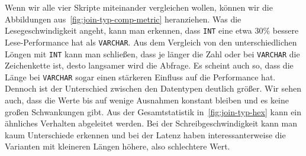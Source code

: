 Wenn wir alle vier Skripte miteinander vergleichen wollen, können wir die Abbildungen aus~\ref{fig:join-typ-comp-metric} heranziehen.
Was die Lesegeschwindigkeit angeht, kann man erkennen, dass \texttt{INT} eine etwa 30\% bessere Lese-Performance hat als \texttt{VARCHAR}.
Aus dem Vergleich von den unterschiedlichen Löngen mit \texttt{INT} kann man schließen, dass je länger die Zahl oder bei \texttt{VARCHAR} die Zeichenkette ist, desto langsamer wird die Abfrage.
Es scheint auch so, dass die Länge bei \texttt{VARCHAR} sogar einen stärkeren Einfluss auf die Performance hat.
Dennoch ist der Unterschied zwischen den Datentypen deutlich größer.
Wir sehen auch, dass die Werte bis auf wenige Ausnahmen konstant bleiben und es keine großen Schwankungen gibt.
Aus der Gesamtstatistik in~\ref{fig:join-typ-hex} kann ein ähnliches Verhalten abgeleitet werden.
Bei der Schreibgeschwindigkeit kann man kaum Unterschiede erkennen und bei der Latenz haben interessanterweise die Varianten mit kleineren Längen höhere, also schlechtere Wert.

